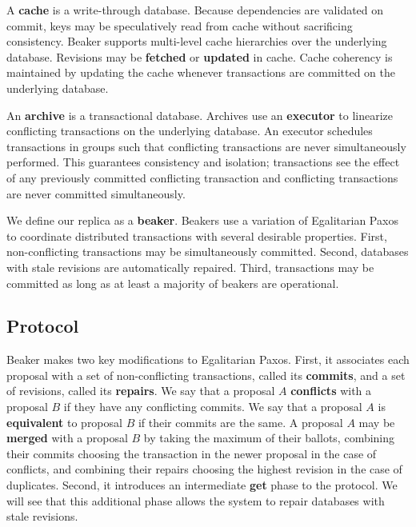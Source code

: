 \documentclass[../main.tex]{subfiles}
\begin{document}
  A \textbf{cache} is a write-through database. Because dependencies are validated on commit, keys
  may be speculatively read from cache without sacrificing consistency. Beaker supports multi-level
  cache hierarchies over the underlying database. Revisions may be \textbf{fetched} or
  \textbf{updated} in cache. Cache coherency is maintained by updating the cache whenever
  transactions are committed on the underlying database.

  An \textbf{archive} is a transactional database. Archives use an \textbf{executor} to linearize
  conflicting transactions on the underlying database. An executor schedules transactions in groups
  such that conflicting transactions are never simultaneously performed. This guarantees consistency
  and isolation; transactions see the effect of any previously committed conflicting transaction and
  conflicting transactions are never committed simultaneously.

  We define our replica as a \textbf{beaker}. Beakers use a variation of Egalitarian Paxos to
  coordinate distributed transactions with several desirable properties. First, non-conflicting
  transactions may be simultaneously committed. Second, databases with stale revisions are
  automatically repaired. Third, transactions may be committed as long as at least a majority of
  beakers are operational.

  \subsection{Protocol}
  Beaker makes two key modifications to Egalitarian Paxos. First, it associates each proposal with
  a set of non-conflicting transactions, called its \textbf{commits}, and a set of revisions,
  called its \textbf{repairs}. We say that a proposal $A$ \textbf{conflicts} with a proposal $B$ if
  they have any conflicting commits. We say that a proposal $A$ is \textbf{equivalent} to proposal
  $B$ if their commits are the same. A proposal $A$ may be \textbf{merged} with a proposal $B$ by
  taking the maximum of their ballots, combining their commits choosing the transaction in the
  newer proposal in the case of conflicts, and combining their repairs choosing the highest
  revision in the case of duplicates. Second, it introduces an intermediate \textbf{get} phase to
  the protocol. We will see that this additional phase allows the system to repair databases with
  stale revisions.
\end{document}
